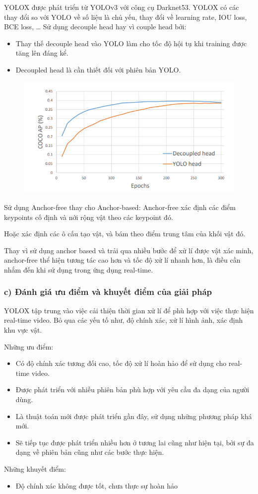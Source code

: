 \documentclass{article}
\begin{document}
	YOLOX được phát triển từ YOLOv3 với công cụ Darknet53. YOLOX có các thay đổi so với YOLO về số liệu là chủ yếu, thay đổi về learning rate, IOU loss, BCE loss, …
	Sử dụng decouple head hay vì couple head bởi:
	\begin{itemize}
		\item Thay thế decouple head vào YOLO làm cho tốc độ hội tụ khi training được tăng lên đáng kể.
		\item Decoupled head là cần thiết đối với phiên bản YOLO.
	\end{itemize}
	\begin{figure}[H]
			\centering
			\includegraphics[width=1\linewidth]{images/b2_4.png}
			\label{fig:writing-thesis}
	\end{figure}
	Sử dụng Anchor-free thay cho Anchor-based:
	Anchor-free xác định các điểm keypoints cố định và nới rộng vật theo các keypoint đó.

	Hoặc xác định các ô cấu tạo vật, và bám theo điểm trung tâm của khối vật đó.

	Thay vì sử dụng anchor based và trải qua nhiều bước để xử lí được vật xác minh, anchor-free thể hiện tương tác cao hơn và tốc độ xử lí  nhanh hơn, là điều cần nhắm đến khi sử dụng trong ứng dụng real-time.
	\subsubsection{c) Đánh giá ưu điểm và khuyết điểm của giải pháp}
	\qquad YOLOX tập trung vào việc cải thiện thời gian xử lí để phù hợp với việc thực hiện real-time video. Bỏ qua các yếu tố như, độ chính xác, xử lí hình ảnh, xác định khu vực vật.
	
	Những ưu điểm:
	\begin{itemize}
		\item Có độ chính xác tương đối cao, tốc độ xử lí hoàn hảo để sử dụng cho real-time video. 
		\item Được phát triển với nhiều phiên bản phù hợp với yêu cầu đa dạng của người dùng.
		\item Là thuật toán mới được phát triển gần đây, sử dụng những phương pháp khá mới.
		\item Sẽ tiếp tục được phát triển nhiều hơn ở tương lai cũng như hiện tại, bởi sự đa dạng về phiên bản cũng như các bước thực hiện.
	\end{itemize}
	Những khuyết điểm:
	\begin{itemize}
		\item Độ chính xác không được tốt, chưa thực sự hoàn hảo
	\end{itemize}
\end{document}
